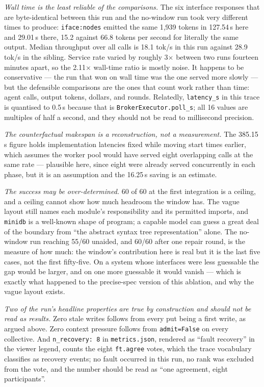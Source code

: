\documentclass[11pt]{article}
\begin{document}
\emph{Wall time is the least reliable of the comparisons.} The six interface responses that are
byte-identical between this run and the no-window run took very different times to produce:
\texttt{iface:nodes} emitted the same 1{,}939 tokens in 127.54\,s here and 29.01\,s there,
15.2 against 66.8 tokens per second for literally the same output. Median throughput over all
calls is 18.1 tok/s in this run against 28.9 tok/s in the sibling. Service rate varied by roughly
3$\times$ between two runs fourteen minutes apart, so the 2.11$\times$ wall-time ratio is mostly
noise. It happens to be conservative --- the run that won on wall time was the one served more
slowly --- but the defensible comparisons are the ones that count work rather than time: agent
calls, output tokens, dollars, and rounds. Relatedly, \texttt{latency\_s} in this trace is
quantised to 0.5\,s because that is \texttt{BrokerExecutor.poll\_s}; all 16 values are multiples
of half a second, and they should not be read to millisecond precision.

\emph{The counterfactual makespan is a reconstruction, not a measurement.} The 385.15\,s figure
holds implementation latencies fixed while moving start times earlier, which assumes the worker
pool would have served eight overlapping calls at the same rate --- plausible here, since eight
were already served concurrently in each phase, but it is an assumption and the 16.25\,s saving
is an estimate.

\emph{The success may be over-determined.} 60 of 60 at the first integration is a ceiling, and a
ceiling cannot show how much headroom the window has. The vague layout still names each module's
responsibility and its permitted imports, and \texttt{minidb} is a well-known shape of program; a
capable model can guess a great deal of the boundary from ``the abstract syntax tree
representation'' alone. The no-window run reaching 55/60 unaided, and 60/60 after one repair
round, is the measure of how much: the window's contribution here is real but it is the last five
cases, not the first fifty-five. On a system whose interfaces were less guessable the gap would
be larger, and on one more guessable it would vanish --- which is exactly what happened to the
precise-spec version of this ablation, and why the vague layout exists.

\emph{Two of the run's headline properties are true by construction and should not be read as
results.} Zero stale writes follows from every put being a first write, as argued above. Zero
context pressure follows from \texttt{admit=False} on every collective. And
\texttt{n\_recovery: 8} in \texttt{metrics.json}, rendered as ``fault recovery'' in the viewer
legend, counts the eight \texttt{ft.agree} votes, which the trace vocabulary classifies as
recovery events; no fault occurred in this run, no rank was excluded from the vote, and the
number should be read as ``one agreement, eight participants''.
\end{document}
